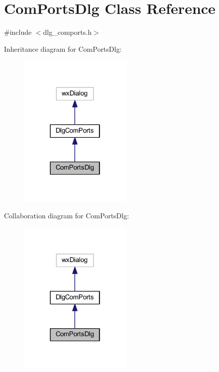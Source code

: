\hypertarget{class_com_ports_dlg}{\section{Com\-Ports\-Dlg Class Reference}
\label{class_com_ports_dlg}
}


{\ttfamily \#include $<$dlg\-\_\-comports.\-h$>$}



Inheritance diagram for Com\-Ports\-Dlg\-:\nopagebreak
\begin{figure}[H]
\begin{center}
\leavevmode
\includegraphics[width=154pt]{class_com_ports_dlg__inherit__graph}
\end{center}
\end{figure}


Collaboration diagram for Com\-Ports\-Dlg\-:\nopagebreak
\begin{figure}[H]
\begin{center}
\leavevmode
\includegraphics[width=154pt]{class_com_ports_dlg__coll__graph}
\end{center}
\end{figure}
